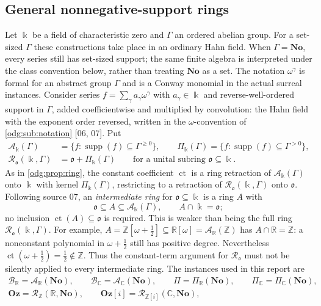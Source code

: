 \documentclass[11pt,oneside]{article}
\numberwithin{equation}{section}
\theoremstyle{definition}
\theoremstyle{remark}
\newcommand{\No}{\mathbf{No}}
\newcommand{\Oz}{\mathbf{Oz}}
\newcommand{\Z}{\mathbb Z}
\newcommand{\R}{\mathbb R}
\newcommand{\C}{\mathbb C}
\newcommand{\BR}{\mathcal B_{\R}}
\newcommand{\BC}{\mathcal B_{\C}}
\newcommand{\ct}{\operatorname{ct}}
\newcommand{\supp}{\operatorname{supp}}
\newcommand{\src}[1]{\textup{\textsf{\small[#1]}}}
\newcommand{\Og}{\Oz[i]}
\begin{document}
\subsection{General nonnegative-support rings}\label{odg:def:sub:setting}

Let $\Bbbk$ be a field of characteristic zero and $\Gamma$ an ordered abelian
group. For a set-sized $\Gamma$ these constructions take place in an
ordinary Hahn field. When $\Gamma=\No$, every series still has set-sized
support; the same finite algebra is interpreted under the class convention
below, rather than treating $\No$ as a set. The notation $\omega^\gamma$ is
formal for an abstract group $\Gamma$ and is a Conway monomial in the actual
surreal instances. Consider series $f=\sum_\gamma a_\gamma\omega^\gamma$ with
$a_\gamma\in\Bbbk$ and reverse-well-ordered support in $\Gamma$, added
coefficientwise and multiplied by convolution: the Hahn field with the
exponent order reversed, written in the $\omega$-convention of
\cref{odg:sub:notation} \src{06, 07}. Put
\begin{align*}
 \mathcal A_\Bbbk(\Gamma)&=\{f:\supp(f)\subseteq\Gamma^{\ge0}\},\qquad
 \Pi_\Bbbk(\Gamma)=\{f:\supp(f)\subseteq\Gamma^{>0}\},\\
 \mathcal R_{\mathfrak o}(\Bbbk,\Gamma)&=\mathfrak o+\Pi_\Bbbk(\Gamma)
 \qquad\text{for a unital subring }\mathfrak o\subseteq\Bbbk .
\end{align*}
As in \cref{odg:prop:ring}, the constant coefficient $\ct$ is a ring
retraction of $\mathcal A_\Bbbk(\Gamma)$ onto $\Bbbk$ with kernel
$\Pi_\Bbbk(\Gamma)$, restricting to a retraction of
$\mathcal R_{\mathfrak o}(\Bbbk,\Gamma)$ onto $\mathfrak o$. Following source
07, an \emph{intermediate ring} for $\mathfrak o\subseteq\Bbbk$ is a ring $A$
with
\begin{equation}\label{odg:def:eq:intermediate}
 \mathfrak o\subseteq A\subseteq\mathcal A_\Bbbk(\Gamma),\qquad
 A\cap\Bbbk=\mathfrak o ;
\end{equation}
no inclusion $\ct(A)\subseteq\mathfrak o$ is required. This is weaker than
being the full ring $\mathcal R_{\mathfrak o}(\Bbbk,\Gamma)$. For example,
$A=\Z[\omega+\tfrac12]\subseteq\R[\omega]=\mathcal A_\R(\Z)$ has
$A\cap\R=\Z$: a nonconstant polynomial in $\omega+\tfrac12$ still has
positive degree. Nevertheless $\ct(\omega+\tfrac12)=\tfrac12\notin\Z$.
Thus the constant-term argument for $\mathcal R_{\mathfrak o}$ must not be
silently applied to every intermediate ring. The instances used in
this report are
\begin{gather*}
 \BR=\mathcal A_\R(\No),\qquad \BC=\mathcal A_\C(\No),\qquad
 \Pi=\Pi_\R(\No),\qquad \Pi_{\C}=\Pi_\C(\No),\\
 \Oz=\mathcal R_\Z(\R,\No),\qquad \Og=\mathcal R_{\Z[i]}(\C,\No),
\end{gather*}
\end{document}
